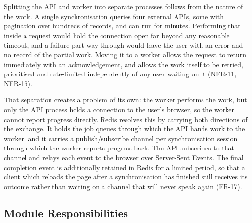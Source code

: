 Splitting the API and worker into separate processes follows from the nature of
the work. A single synchronisation queries four external APIs, some with
pagination over hundreds of records, and can run for minutes. Performing that
inside a request would hold the connection open far beyond any reasonable
timeout, and a failure part-way through would leave the user with an error and no
record of the partial work. Moving it to a worker allows the request to return
immediately with an acknowledgement, and allows the work itself to be retried,
prioritised and rate-limited independently of any user waiting on it (NFR-11,
NFR-16).

That separation creates a problem of its own: the worker performs the work, but
only the API process holds a connection to the user's browser, so the worker
cannot report progress directly. Redis resolves this by carrying both directions
of the exchange. It holds the job queues through which the API hands work to the
worker, and it carries a publish/subscribe channel per synchronisation session
through which the worker reports progress back. The API subscribes to that
channel and relays each event to the browser over Server-Sent Events. The final
completion event is additionally retained in Redis for a limited period, so that a
client which reloads the page after a synchronisation has finished still receives
its outcome rather than waiting on a channel that will never speak again
(FR-17).

\subsection{Module Responsibilities}
\label{subsec:module-responsibilities}

